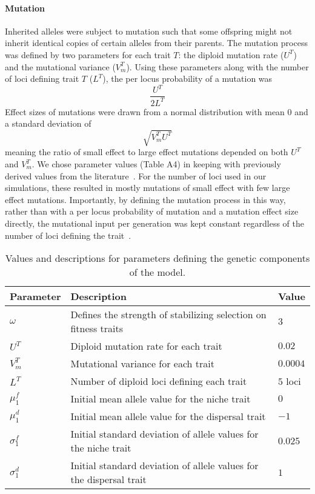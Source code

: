 \documentclass[11pt]{article}
\begin{document}
\paragraph{Mutation}
Inherited alleles were subject to mutation such that some offspring might not inherit identical copies of certain alleles from their parents. The mutation process was defined by two parameters for each trait $T$: the diploid mutation rate ($U^{T}$) and the mutational variance ($V_{m}^{T}$). Using these parameters along with the number of loci defining trait $T$ ($L^{T}$), the per locus probability of a mutation was
\begin{equation}
\frac{U^{T}}{2L^{T}}
\end{equation}
Effect sizes of mutations were drawn from a normal distribution with mean $0$ and a standard deviation of
\begin{equation}
\sqrt{V_{m}^{T}U^{T}}
\end{equation}
meaning the ratio of small effect to large effect mutations depended on both $U^{T}$ and $V_{m}^{T}$. We chose parameter values (Table A4) in keeping with previously derived values from the literature~\citep{gilbert2017local}. For the number of loci used in our simulations, these resulted in mostly mutations of small effect with few large effect mutations. Importantly, by defining the mutation process in this way, rather than with a per locus probability of mutation and a mutation effect size directly, the mutational input per generation was kept constant regardless of the number of loci defining the trait~\citep{schiffers2014landscape}.

\begin{table}
\renewcommand{\arraystretch}{1.5}
  \begin{tabular}{ p{2cm} | p{8cm} | p{2cm} }
    \hline
    Parameter & Description & Value \\ \hline \hline
    $\omega$ & Defines the strength of stabilizing selection on fitness traits & $3$ \\
    $U^{T}$ & Diploid mutation rate for each trait & $0.02$ \\
    $V_{m}^{T}$ & Mutational variance for each trait & $0.0004$ \\
    $L^{T}$ & Number of diploid loci defining each trait & $5$ loci \\
    $\mu_{1}^{f}$ & Initial mean allele value for the niche trait & $0$ \\
    $\mu_{1}^{d}$ & Initial mean allele value for the dispersal trait & $-1$ \\
    $\sigma_{1}^{f}$ & Initial standard deviation of allele values for the niche trait & $0.025$ \\
    $\sigma_{1}^{d}$ & Initial standard deviation of allele values for the dispersal trait & $1$ \\
    \hline
  \end{tabular}
\caption[LoF entry]{Values and descriptions for parameters defining the genetic components of the model.}
\label{table:GenPars}
\end{table}
\end{document}
